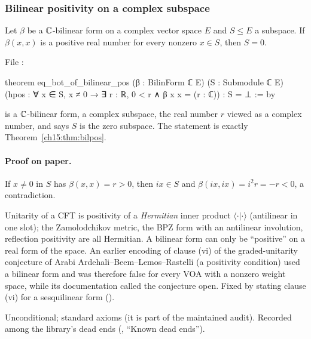 \subsubsection{Bilinear positivity on a complex subspace}

\begin{theorem}\label{ch15:thm:bilpos}
Let $\beta$ be a ${\mathbb{C}}$-bilinear form on a complex vector space $E$ and $S\le E$ a subspace. If
$\beta(x,x)$ is a positive real number for every nonzero $x\in S$, then $S=0$.
\end{theorem}

File :
\begin{leancode}
theorem eq_bot_of_bilinear_pos (β : BilinForm ℂ E) (S : Submodule ℂ E)
    (hpos : ∀ x ∈ S, x ≠ 0 → ∃ r : ℝ, 0 < r ∧ β x x = (r : ℂ)) : S = ⊥ := by
\end{leancode}

\begin{dictionary}
 is a ${\mathbb{C}}$-bilinear form,  a complex subspace,
 the real number $r$ viewed as a complex number, and  says $S$ is the
zero subspace. The statement is exactly Theorem~\ref{ch15:thm:bilpos}.
\end{dictionary}

\paragraph{Proof on paper.} If $x\neq0$ in $S$ has $\beta(x,x)=r>0$, then $ix\in S$ and
$\beta(ix,ix)=i^2r=-r<0$, a contradiction.

\begin{physics}
Unitarity of a CFT is positivity of a \emph{Hermitian} inner product $\langle\cdot|\cdot\rangle$
(antilinear in one slot); the Zamolodchikov metric, the BPZ form with an antilinear involution,
reflection positivity are all Hermitian. A bilinear form can only be ``positive'' on a real form of
the space. An earlier encoding of clause (vi) of the graded-unitarity conjecture of
Arabi Ardehali--Beem--Lemos--Rastelli (a positivity condition) used a bilinear form and was therefore false for every
VOA with a nonzero weight space, while its documentation called the conjecture open. Fixed by
stating clause (vi) for a sesquilinear form ().
\end{physics}

\begin{status}
Unconditional; standard axioms (it is part of the maintained audit). Recorded among the
library's dead ends (, ``Known dead ends'').
\end{status}

